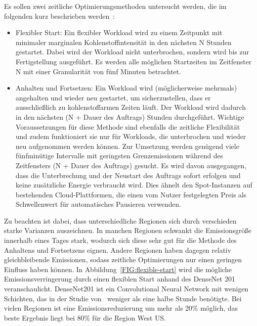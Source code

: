 Es sollen zwei zeitliche Optimierungsmethoden untersucht werden, die im folgenden kurz beschrieben werden~\cite{Dodge.06212022}:
\begin{itemize}
 \item Flexibler Start: Ein flexibler Workload wird zu einem Zeitpunkt mit minimaler marginalen Kohlenstoffintensität in den nächsten N Stunden gestartet.
 Dabei wird der Workload nicht unterbrochen, sondern wird bis zur Fertigstellung ausgeführt.
 Es werden alle möglichen Startzeiten im Zeitfenster N mit einer Granularität von fünf Minuten betrachtet.
 \item Anhalten und Fortsetzen: Ein Workload wird (möglicherweise mehrmals) angehalten und wieder neu gestartet, um sicherzustellen, dass er ausschließlich zu kohlenstoffarmen Zeiten läuft.
 Der Workload wird dadurch in den nächsten (N + Dauer des Auftrags) Stunden durchgeführt.
 Wichtige Voraussetzungen für diese Methode sind ebenfalls die zeitliche Flexibilität und zudem funktioniert sie nur für Workloads, die unterbrochen und wieder neu aufgenommen werden können.
 Zur Umsetzung werden genügend viele fünfminütige Intervalle mit geringsten Grenzemissionen während des Zeitfensters (N + Dauer des Auftrags) gesucht.
 Es wird davon ausgegangen, dass die Unterbrechung und der Neustart des Auftrags sofort erfolgen und keine zusätzliche Energie verbraucht wird.
 Dies ähnelt den Spot-Instanzen auf bestehenden Cloud-Plattformen, die einen vom Nutzer festgelegten Preis als Schwellenwert für automatisches Pausieren verwenden.
\end {itemize}
Zu beachten ist dabei, dass unterschiedliche Regionen sich durch verschieden starke Varianzen auszeichnen.
In manchen Regionen schwankt die Emissionsgröße innerhalb eines Tages stark, wodurch sich diese sehr gut für die Methode des Anhaltens und Fortsetzens eignen.
Andere Regionen haben dagegen relativ gleichbleibende Emissionen, sodass zeitliche Optimierungen nur einen geringen Einfluss haben können.
In Abbildung~\ref{FIG:flexible-start} wird die mögliche Emissionsverringerung durch einen flexiblen Start anhand des DenseNet 201 veranschaulicht.
DenseNet201 ist ein Convolutional Neural Network mit wenigen Schichten, das in der Studie von~\cite{Dodge.06212022} weniger als eine halbe Stunde benötigte.
Bei vielen Regionen ist eine Emissionsreduzierung um mehr als 20\% möglich, das beste Ergebnis liegt bei 80\% für die Region West US\@.
